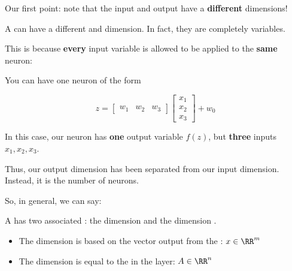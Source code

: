         Our first point: note that the input and output have a \textbf{different} dimensions!\\
        
        \begin{clarification}
            A  can have a different  and  dimension. In fact, they are completely  variables.
        \end{clarification}
        
        This is because \textbf{every} input variable is allowed to be applied to the \textbf{same} neuron: 
            
        \miniex You can have one neuron of the form
        
        \begin{equation*}
            z = 
            \begin{bmatrix}
                w_1 & w_2 & w_3
            \end{bmatrix}
            \begin{bmatrix}
                x_1\\x_2\\x_3
            \end{bmatrix}
            +
            w_0
        \end{equation*}
        
        In this case, our neuron has \textbf{one} output variable $f(z)$, but \textbf{three} inputs $x_1,x_2,x_3$.
        
        Thus, our output dimension has been separated from our input dimension. Instead, it is the number of neurons.
        
        So, in general, we can say:\\
        
        \begin{notation}
            A  has two associated : the  dimension  and the  dimension .
            
            \begin{itemize}
                \item The  dimension  is based on the vector output from the : $x \in \RR^m$
                
                \item The  dimension  is equal to the  in the  layer: $A \in \RR^n$
            \end{itemize}
        \end{notation}
        
